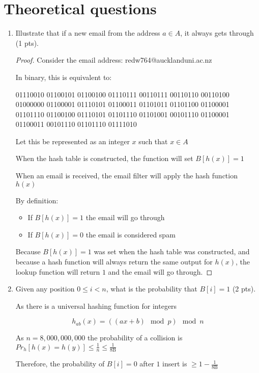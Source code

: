 \documentclass[12pt,letterpaper]{article}
\begin{document}
	\section*{Theoretical questions}

	
	\begin{enumerate}
		\item 
		Illustrate that if a new email from the address $a \in A$, it always gets through (1 pts).
		
		\begin{proof}
		Consider the email address: redw764@aucklanduni.ac.nz
		
		In binary, this is equivalent to:
		
		01110010 01100101 01100100 01110111 00110111 00110110 00110100 01000000 01100001 01110101 01100011 01101011 01101100 01100001 01101110 01100100 01110101 01101110 01101001 00101110 01100001 01100011 00101110 01101110 01111010
		
		Let this be represented as an integer $x$ such that $x \in A$
		
		When the hash table is constructed, the function will set $B[h(x)] = 1$
		
		When an email is received, the email filter will apply the hash function $h(x)$
		
		By definition:
		\begin{itemize}
			\item 
			If $B[h(x)] = 1$ the email will go through
			\item 
			If $B[h(x)] = 0$ the email is considered spam
		\end{itemize}
		
		Because $B[h(x)] = 1$ was set when the hash table was constructed, and because a hash function will always return the same output for $h(x)$, the lookup function will return $1$ and the email will go through.
		
	\end{proof}
		
		\item
		Given any position $0 \leq i < n$, what is the probability that $B[i] = 1$ (2 pts).
		
		As there is a universal hashing function for integers
		
		$$ h_{ab}(x) = ((ax + b) \mod p) \mod n $$
		
		As $n = 8,000,000,000$ the probability of a collision is $Pr_h[h(x)=h(y)] \leq \frac{1}{n} \leq \frac{1}{8\text{B}}$
		
		Therefore, the probability of $B[i] = 0$ after $1$ insert is $\geq 1 - \frac{1}{8\text{B}}$
		

\end{enumerate}
\end{document}
